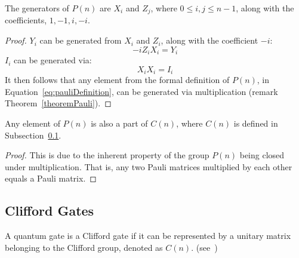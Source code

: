 \begin{theorem}
\label{theorem:pauliGenerators}
The generators of $P(n)$ are $X_i$ and $Z_j$, where $0 \leq i, j \leq n-1$, along with the coefficients, $1,-1,i,-i$.
\end{theorem}
\begin{proof}
$Y_i$ can be generated from $X_i$ and $Z_i$, along with the coefficient $-i$:
$$-iZ_iX_i = Y_i$$
$I_i$ can be generated via:
$$X_iX_i = I_i$$
It then follows that any element from the formal definition of $P(n)$, in Equation~\eqref{eq:pauliDefinition}, can be generated via multiplication (remark Theorem~\ref{theoremPauli}).
\end{proof}

\begin{theorem}
\label{theorem:paulisAreCliffords}
Any element of $P(n)$ is also a part of $C(n)$, where $C(n)$ is defined in Subsection~\ref{subsubsection:Clifford}.
\end{theorem}
\begin{proof}
This is due to the inherent property of the group $P(n)$ being closed under multiplication. That is, any two Pauli matrices multiplied by each other equals a Pauli matrix.
\end{proof}

\subsection{Clifford Gates}
\label{subsubsection:Clifford}
A quantum gate is a Clifford gate if it can be represented by a unitary matrix belonging to the Clifford group, denoted as $C(n)$. (see~\cite{gottesman1997stabilizer})


